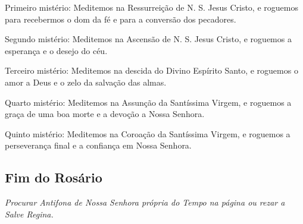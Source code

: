 {\redx Primeiro mistério:} Meditemos na Ressurreição de N. S. Jesus Cristo, e roguemos para recebermos o dom da fé e para a conversão dos pecadores.\par
{\redx Segundo mistério:} Meditemos na Ascensão de N. S. Jesus Cristo, e roguemos a esperança e o desejo do céu.\par
{\redx Terceiro mistério:} Meditemos na descida do Divino Espírito Santo, e roguemos o amor a Deus e o zelo da salvação das almas.\par
{\redx Quarto mistério:} Meditemos na Assunção da Santíssima Virgem, e roguemos a graça de uma boa morte e a devoção a Nossa Senhora.\par
{\redx Quinto mistério:} Meditemos na Coroação da Santíssima Virgem, e roguemos a perseverança final e a confiança em Nossa Senhora.

\subsection{Fim do Rosário}

\emph{Procurar Antifona de Nossa Senhora própria do Tempo na página \pageref{antifonasnossasenhora} ou rezar a Salve Regina.}



